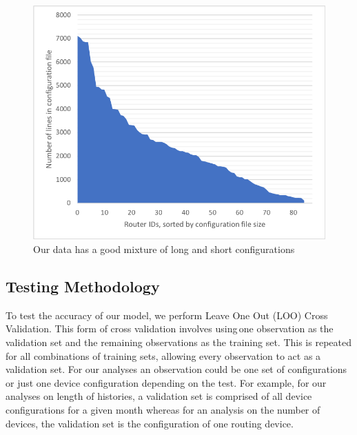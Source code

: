 \begin{figure}[H]
	\centering
	\includegraphics[width=5in]{config_sizes.png}
	\caption{Our data has a good mixture of long and short configurations}
\end{figure}

\subsection{Testing Methodology}

To test the accuracy of our model, we perform Leave One Out (LOO) Cross Validation. This form of cross validation involves using one observation as the validation set and the remaining observations as the training set. This is repeated for all combinations of training sets, allowing every observation to act as a validation set. For our analyses an observation could be one set of configurations or just one device configuration depending on the test. For example, for our analyses on length of histories, a validation set is comprised of all device configurations for a given month whereas for an analysis on the number of devices, the validation set is the configuration of one routing device.\\

